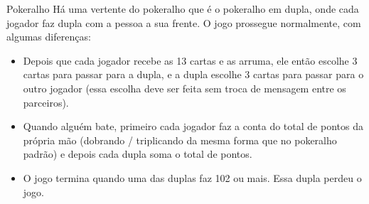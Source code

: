 \begin{subsecao}{Pokeralho}
Há uma vertente do pokeralho que é o pokeralho em dupla, onde cada jogador faz
dupla com a pessoa a sua frente. O jogo prossegue normalmente, com algumas
diferenças: 
\begin{itemize}
\item Depois que cada jogador recebe as 13 cartas e as arruma, ele então
escolhe 3 cartas para passar para a dupla, e a dupla escolhe 3 cartas para
passar para o outro jogador (essa escolha deve ser feita sem troca de mensagem
entre os parceiros). 
\item Quando alguém bate, primeiro cada jogador faz a conta do total de pontos
da própria mão (dobrando / triplicando da mesma forma que no pokeralho padrão)
e depois cada dupla soma o total de pontos. 
\item O jogo termina quando uma das duplas faz 102 ou mais. Essa dupla perdeu o
jogo. 

\end{itemize}
\end{subsecao}
